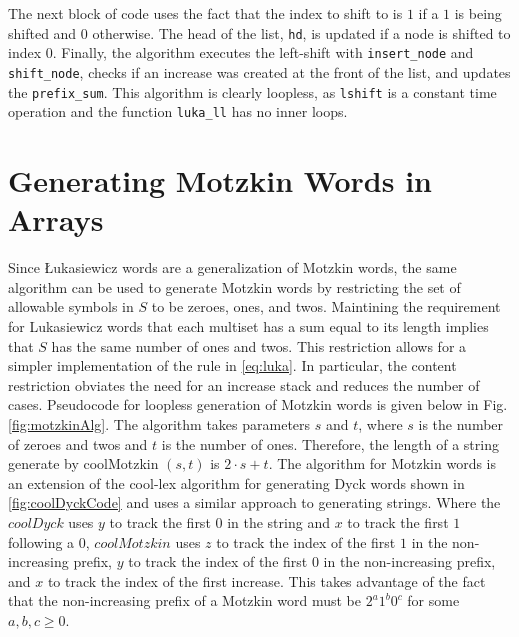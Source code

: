 The next block of code uses the fact that the index to shift to is $1$ if a $1$ is being shifted and $0$ otherwise.  The head of the list, \verb$hd$, is updated if a node is shifted to index 0.  Finally, the algorithm executes the left-shift with \verb$insert_node$ and \verb$shift_node$, checks if an increase was created at the front of the list, and updates the \verb$prefix_sum$.  This algorithm is clearly loopless, as \verb$lshift$ is a constant time operation and the function \verb$luka_ll$ has no inner loops.

\section{Generating Motzkin Words in Arrays}\label{sec:coolMotz}
Since Łukasiewicz words are a generalization of Motzkin words, the same algorithm can be used to generate Motzkin words by restricting the set of allowable symbols in $S$ to be zeroes, ones, and twos. Maintining the requirement for Lukasiewicz words that each multiset has a sum equal to its length implies that $S$ has the same number of ones and twos.  This restriction allows for a simpler implementation of the rule in \eqref{eq:luka}.  In particular, the content restriction obviates the need for an increase stack and reduces the number of cases.   Pseudocode for loopless generation of Motzkin words is given below in Fig. \ref{fig:motzkinAlg}.
The algorithm takes parameters $s$ and $t$, where $s$ is the number of zeroes and twos and $t$ is the number of ones.  Therefore, the length of a string generate by coolMotzkin $(s,t)$ is $2\cdot s + t$.
The algorithm for Motzkin words is an extension of the cool-lex algorithm for generating Dyck words shown in \ref{fig:coolDyckCode} and uses a similar approach to generating strings.
Where the $coolDyck$ uses $y$ to track the first $0$ in the string and $x$ to track the first $1$ following a $0$, $coolMotzkin$ uses $z$ to track the index of the first $1$ in the non-increasing prefix, $y$ to track the index of the first $0$ in the non-increasing prefix, and $x$ to track the index of the first increase.  This takes advantage of the fact that the non-increasing prefix of a Motzkin word must be $2^a1^b0^c$ for some $a,b,c \ge 0$.


